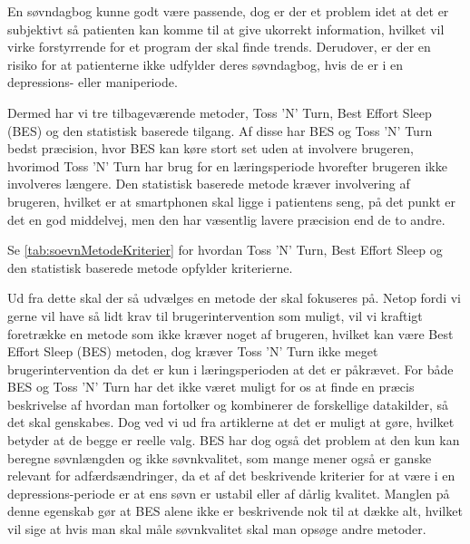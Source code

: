 En søvndagbog kunne godt være passende, dog er der et problem idet at det er subjektivt så patienten kan komme til at give ukorrekt information, hvilket vil virke forstyrrende for et program der skal finde trends.
Derudover, er der en risiko for at patienterne ikke udfylder deres søvndagbog, hvis de er i en depressions- eller maniperiode.

Dermed har vi tre tilbageværende metoder, Toss 'N' Turn, Best Effort Sleep (BES) og den statistisk baserede tilgang.
Af disse har BES og Toss 'N' Turn bedst præcision, hvor BES kan køre stort set uden at involvere brugeren, hvorimod Toss 'N' Turn har brug for en læringsperiode hvorefter brugeren ikke involveres længere.
Den statistisk baserede metode kræver involvering af brugeren, hvilket er at smartphonen skal ligge i patientens seng, på det punkt er det en god middelvej, men den har væsentlig lavere præcision end de to andre.

Se \cref{tab:soevnMetodeKriterier} for hvordan Toss 'N' Turn, Best Effort Sleep og den statistisk baserede metode opfylder kriterierne.

\begin{table}
\caption{Hvordan de 3 forskellige metoder overholder kriterierne.}
\label{tab:soevnMetodeKriterier}
\end{table}

Ud fra dette skal der så udvælges en metode der skal fokuseres på. 
Netop fordi vi gerne vil have så lidt krav til brugerintervention som muligt, vil vi kraftigt foretrække en metode som ikke kræver noget af brugeren, hvilket kan være Best Effort Sleep (BES) metoden, dog kræver Toss 'N' Turn ikke meget brugerintervention da det er kun i læringsperioden at det er påkrævet.
For både BES og Toss 'N' Turn har det ikke været muligt for os at finde en præcis beskrivelse af hvordan man fortolker og kombinerer de forskellige datakilder, så det skal genskabes.
Dog ved vi ud fra artiklerne at det er muligt at gøre, hvilket betyder at de begge er reelle valg. 
BES har dog også det problem at den kun kan beregne søvnlængden og ikke søvnkvalitet, som mange mener også er ganske relevant for adfærdsændringer, da et af det beskrivende kriterier for at være i en depressions-periode er at ens søvn er ustabil eller af dårlig kvalitet. 
Manglen på denne egenskab gør at BES alene ikke er beskrivende nok til at dække alt, hvilket vil sige at hvis man skal måle søvnkvalitet skal man opsøge andre metoder.

